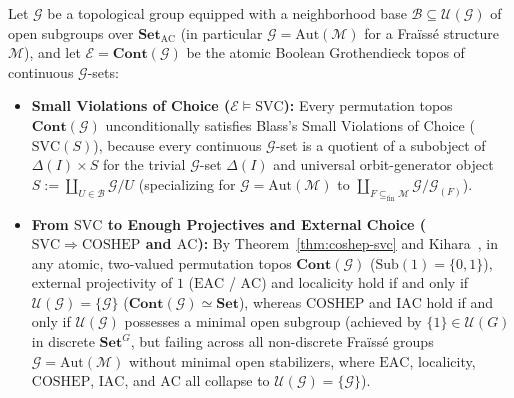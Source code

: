 \begin{theorem}\label{thm:permutation-topos}%
%
%
Let $\mathcal{G}$ be a topological group equipped with a neighborhood base $\mathcal{B} \subseteq \mathcal{U}(\mathcal{G})$ of open subgroups over $\mathbf{Set}_{\mathrm{AC}}$ (in particular $\mathcal{G} = \mathrm{Aut}(\mathcal{M})$ for a Fra\"iss\'e structure $\mathcal{M}$), and let $\mathcal{E} = \mathbf{Cont}(\mathcal{G})$ be the atomic Boolean Grothendieck topos of continuous $\mathcal{G}$-sets:

\begin{itemize}

  \item \textbf{Small Violations of Choice ($\mathcal{E} \models \mathrm{SVC}$):} Every permutation topos $\mathbf{Cont}(\mathcal{G})$ unconditionally satisfies Blass's Small Violations of Choice ($\mathrm{SVC}(S)$), because every continuous $\mathcal{G}$-set is a quotient of a subobject of $\Delta(I) \times S$ for the trivial $\mathcal{G}$-set $\Delta(I)$ and universal orbit-generator object $S := \coprod_{U \in \mathcal{B}} \mathcal{G}/U$ (specializing for $\mathcal{G} = \mathrm{Aut}(\mathcal{M})$ to $\coprod_{F \subseteq_{\mathrm{fin}} \mathcal{M}} \mathcal{G}/\mathcal{G}_{(F)}$).

  \item \textbf{From $\mathrm{SVC}$ to Enough Projectives and External Choice ($\mathrm{SVC} \Rightarrow \mathrm{COSHEP}$ and $\mathrm{AC}$):} By Theorem~\ref{thm:coshep-svc} and Kihara~\cite[Theorems~6.2 and~6.19]{Kihara26}, in any atomic, two-valued permutation topos $\mathbf{Cont}(\mathcal{G})$ ($\mathrm{Sub}(1) = \{0, 1\}$), external projectivity of $1$ ($\mathrm{EAC}$ / $\mathrm{AC}$) and localicity hold if and only if $\mathcal{U}(\mathcal{G}) = \{\mathcal{G}\}$ ($\mathbf{Cont}(\mathcal{G}) \simeq \mathbf{Set}$), whereas $\mathrm{COSHEP}$ and $\mathrm{IAC}$ hold if and only if $\mathcal{U}(\mathcal{G})$ possesses a minimal open subgroup (achieved by $\{1\} \in \mathcal{U}(G)$ in discrete $\mathbf{Set}^G$, but failing across all non-discrete Fra\"iss\'e groups $\mathcal{G} = \mathrm{Aut}(\mathcal{M})$ without minimal open stabilizers, where $\mathrm{EAC}$, localicity, $\mathrm{COSHEP}$, $\mathrm{IAC}$, and $\mathrm{AC}$ all collapse to $\mathcal{U}(\mathcal{G}) = \{\mathcal{G}\}$).


\end{itemize}
\end{theorem}
